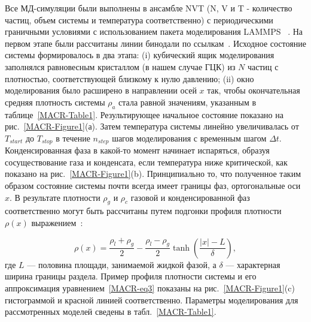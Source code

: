 Все МД-симуляции были выполнены в ансамбле NVT (N, V и T - количество частиц, объем системы и температура соответственно) с периодическими граничными условиями с использованием пакета моделирования LAMMPS~\cite{10.1006/jcph.1995.1039} .
На первом этапе были рассчитаны линии бинодали по ссылкам~\cite{10.1021/jp806127j, 10.1021/jp1117213}.
Исходное состояние системы формировалось в два этапа: (i) кубический ящик моделирования заполнялся равновесным кристаллом (в нашем случае ГЦК) из $N$ частиц с плотностью, соответствующей близкому к нулю давлению; (ii) окно моделирования было расширено в направлении осей $x$ так, чтобы окончательная средняя плотность системы $\rho_a$ стала равной значениям, указанным в таблице~\ref{MACR-Table1}.
Результирующее начальное состояние показано на рис.~\ref{MACR-Figure1}(а).
Затем температура системы линейно увеличивалась от $T_{start}$ до $T_{stop}$ в течение $n_{step}$ шагов моделирования с временным шагом $\Delta t$.
Конденсированная фаза в какой-то момент начинает испаряться, образуя сосуществование газа и конденсата, если температура ниже критической, как показано на рис.~\ref{MACR-Figure1}(b).
Принципиально то, что полученное таким образом состояние системы почти всегда имеет границы фаз, ортогональные оси $x$.
В результате плотности $\rho_g$ и $\rho_c$ газовой и конденсированной фаз соответственно могут быть рассчитаны путем подгонки профиля плотности $\rho(x)$ выражением~\cite{10.1021/jp806127j, 10.1021/jp1117213}:

\begin{equation}
    \rho(x)=\frac{\rho_{l}+\rho_{g}}{2}-\frac{\rho_{l}-\rho_{g}}{2} \tanh \left(\frac{|x|-L}{\delta}\right),
    \label{MACR-eq3}
\end{equation}
где $L$ — половина площади, занимаемой жидкой фазой, а $\delta$ — характерная ширина границы раздела.
Пример профиля плотности системы и его аппроксимация уравнением~\eqref{MACR-eq3} показаны на рис.~\ref{MACR-Figure1}(c) гистограммой и красной линией соответственно.
Параметры моделирования для рассмотренных моделей сведены в табл.~\ref{MACR-Table1}.


